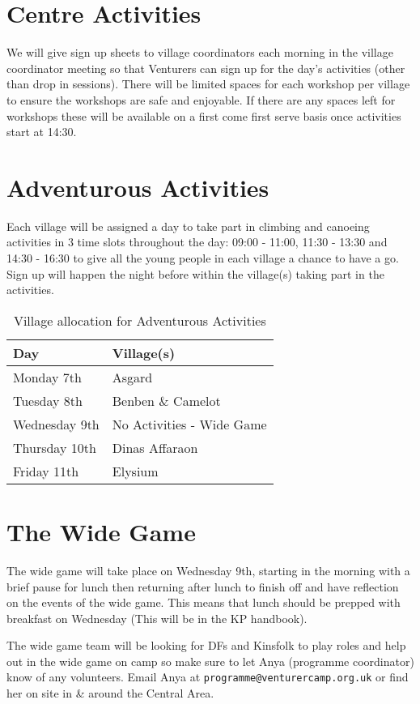 \documentclass[a4paper, 11pt]{report}
\begin{document}
\section{Centre Activities}
We will give sign up sheets to village coordinators each morning in the village coordinator meeting so that Venturers can sign up for the day's activities (other than drop in sessions). There will be limited spaces for each workshop per village to ensure the workshops are safe and enjoyable. If there are any spaces left for workshops these will be available on a first come first serve basis once activities start at 14:30.

\section{Adventurous Activities}
Each village will be assigned a day to take part in climbing and canoeing activities in 3 time slots throughout the day: 09:00 - 11:00, 11:30 - 13:30 and 14:30 - 16:30 to give all the young people in each village a chance to have a go. Sign up will happen the night before within the village(s) taking part in the activities. 
\begin{table}[H]
    \centering
    \begin{tabular}{ll}
    \textbf{Day} & \textbf{Village(s)}\\
    \hline
    Monday 7th & Asgard \\
    \hline
    Tuesday 8th & Benben \& Camelot \\
    \hline
    Wednesday 9th & No Activities - Wide Game \\
    \hline
    Thursday 10th & Dinas Affaraon \\
    \hline
    Friday 11th & Elysium \\
    \hline
    \end{tabular}
    \caption{Village allocation for Adventurous Activities}
\end{table}

\section{The Wide Game}
The wide game will take place on Wednesday 9th, starting in the morning with a brief pause for lunch then returning after lunch to finish off and have reflection on the events of the wide game. This means that lunch should be prepped with breakfast on Wednesday (This will be in the KP handbook).\nl

The wide game team will be looking for DFs and Kinsfolk to play roles and help out in the wide game on camp so make sure to let Anya (programme coordinator) know of any volunteers. Email Anya at \texttt{programme@venturercamp.org.uk} or find her on site in \& around the Central Area.
\end{document}
